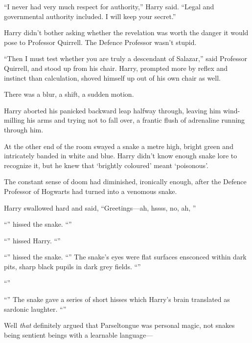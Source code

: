 “I never had very much respect for authority,” Harry said.
“Legal and governmental authority included. I will keep your secret.”

Harry didn’t bother asking whether the revelation was worth the danger it would pose to Professor Quirrell. The Defence Professor wasn’t stupid.

“Then I must test whether you are truly a descendant of Salazar,” said Professor Quirrell, and stood up from his chair. Harry, prompted more by reflex and instinct than calculation, shoved himself up out of his own chair as well.

There was a blur, a shift, a sudden motion.

Harry aborted his panicked backward leap halfway through, leaving him wind-milling his arms and trying not to fall over, a frantic flush of adrenaline running through him.

At the other end of the room swayed a snake a metre high, bright green and intricately banded in white and blue. Harry didn’t know enough snake lore to recognize it, but he knew that ‘brightly coloured’ meant ‘poisonous’.

The constant sense of doom had diminished, ironically enough, after the Defence Professor of Hogwarts had turned into a venomous snake.

Harry swallowed hard and said,
“Greetings—ah, hssss, no, ah, ”

“” hissed the snake. “”

“” hissed Harry. “”

“” hissed the snake. “” The snake’s eyes were flat surfaces ensconced within dark pits, sharp black pupils in dark grey fields. “”

“”

“” The snake gave a series of short hisses which Harry’s brain translated as sardonic laughter. “”

Well \emph{that} definitely argued that Parseltongue was personal magic, not snakes being sentient beings with a learnable language—

